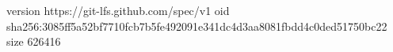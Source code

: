 version https://git-lfs.github.com/spec/v1
oid sha256:3085ff5a52bf7710fcb7b5fe492091e341dc4d3aa8081fbdd4c0ded51750bc22
size 626416
